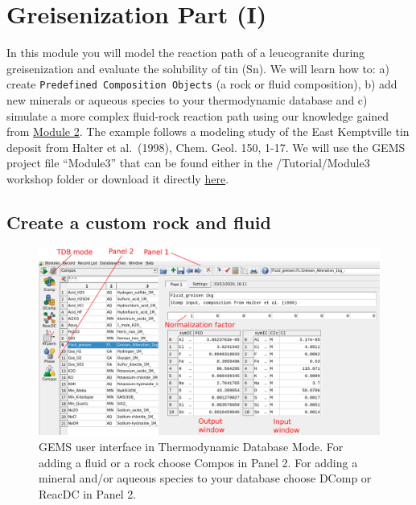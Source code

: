 \documentclass[
]{book}
\begin{document}
\hypertarget{module3}{%
\chapter{Greisenization Part (I)}\label{module3}}

In this module you will model the reaction path of a leucogranite during greisenization and evaluate the solubility of tin (Sn). We will learn how to: a) create \texttt{Predefined\ Composition\ Objects} (a rock or fluid composition), b) add new minerals or aqueous species to your thermodynamic database and c) simulate a more complex fluid-rock reaction path using our knowledge gained from \protect\hyperlink{module2}{Module 2}. The example follows a modeling study of the East Kemptville tin deposit from Halter et al.~(1998), Chem. Geol. 150, 1-17. We will use the GEMS project file ``Module3'' that can be found either in the /Tutorial/Module3 workshop folder or download it directly \href{https://geoinfo.nmt.edu/mines-tdb/GEMS-files/Module3.zip}{here}.

\hypertarget{create-a-custom-rock-and-fluid}{%
\section{Create a custom rock and fluid}\label{create-a-custom-rock-and-fluid}}

\begin{figure}
\includegraphics[width=1\linewidth]{figures/module3/fig-1} \caption{GEMS user interface in Thermodynamic Database Mode. For adding a fluid or a rock choose Compos in Panel 2. For adding a mineral and/or aqueous species to your database choose DComp or ReacDC in Panel 2.}\label{fig:fig-1c}
\end{figure}
\end{document}
